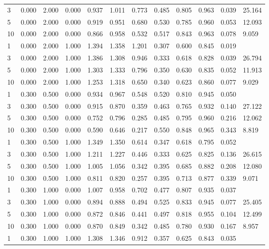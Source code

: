 {\begin{longtable}{llllllllllll}
3 & 0.000 & 2.000 & 0.000 & 0.937 & 1.011 & 0.773 & 0.485 & 0.805 & 0.963 & 0.039 & 25.164 \\
5 & 0.000 & 2.000 & 0.000 & 0.919 & 0.951 & 0.680 & 0.530 & 0.785 & 0.960 & 0.053 & 12.093 \\
10 & 0.000 & 2.000 & 0.000 & 0.866 & 0.958 & 0.532 & 0.517 & 0.843 & 0.963 & 0.078 & 9.059 \\
1 & 0.000 & 2.000 & 1.000 & 1.394 & 1.358 & 1.201 & 0.307 & 0.600 & 0.845 & 0.019 &  \\
3 & 0.000 & 2.000 & 1.000 & 1.386 & 1.308 & 0.946 & 0.333 & 0.618 & 0.828 & 0.039 & 26.794 \\
5 & 0.000 & 2.000 & 1.000 & 1.303 & 1.333 & 0.796 & 0.350 & 0.630 & 0.835 & 0.052 & 11.913 \\
10 & 0.000 & 2.000 & 1.000 & 1.253 & 1.318 & 0.650 & 0.340 & 0.623 & 0.860 & 0.077 & 9.029 \\
1 & 0.300 & 0.500 & 0.000 & 0.934 & 0.967 & 0.548 & 0.520 & 0.810 & 0.945 & 0.050 &  \\
3 & 0.300 & 0.500 & 0.000 & 0.915 & 0.870 & 0.359 & 0.463 & 0.765 & 0.932 & 0.140 & 27.122 \\
5 & 0.300 & 0.500 & 0.000 & 0.752 & 0.796 & 0.285 & 0.485 & 0.795 & 0.960 & 0.216 & 12.062 \\
10 & 0.300 & 0.500 & 0.000 & 0.590 & 0.646 & 0.217 & 0.550 & 0.848 & 0.965 & 0.343 & 8.819 \\
1 & 0.300 & 0.500 & 1.000 & 1.349 & 1.350 & 0.614 & 0.347 & 0.618 & 0.795 & 0.052 &  \\
3 & 0.300 & 0.500 & 1.000 & 1.211 & 1.227 & 0.446 & 0.333 & 0.625 & 0.825 & 0.136 & 26.615 \\
5 & 0.300 & 0.500 & 1.000 & 1.005 & 1.056 & 0.342 & 0.395 & 0.685 & 0.882 & 0.208 & 12.080 \\
10 & 0.300 & 0.500 & 1.000 & 0.811 & 0.820 & 0.257 & 0.395 & 0.713 & 0.877 & 0.339 & 9.071 \\
1 & 0.300 & 1.000 & 0.000 & 1.007 & 0.958 & 0.702 & 0.477 & 0.807 & 0.935 & 0.037 &  \\
3 & 0.300 & 1.000 & 0.000 & 0.894 & 0.888 & 0.494 & 0.525 & 0.833 & 0.945 & 0.077 & 25.405 \\
5 & 0.300 & 1.000 & 0.000 & 0.872 & 0.846 & 0.441 & 0.497 & 0.818 & 0.955 & 0.104 & 12.499 \\
10 & 0.300 & 1.000 & 0.000 & 0.870 & 0.849 & 0.342 & 0.485 & 0.780 & 0.930 & 0.167 & 8.957 \\
1 & 0.300 & 1.000 & 1.000 & 1.308 & 1.346 & 0.912 & 0.357 & 0.625 & 0.843 & 0.035 &  \\

\end{longtable}}

